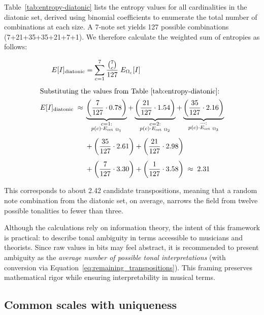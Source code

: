 \documentclass[10pt,twocolumn]{article}
\numberwithin{equation}{section} %
\begin{document}
    Table~\ref{tab:entropy-diatonic} lists the entropy values for all cardinalities in the diatonic set, derived using binomial coefficients to enumerate the total number of combinations at each size.
    A 7‑note set yields 127 possible combinations (7+21+35+35+21+7+1).
    We therefore calculate the weighted sum of entropies as follows:

    \begin{align}
        E[I]_{\text{diatonic}} &= \sum_{c=1}^{7} \frac{\binom{7}{c}}{127} \; E_{\Omega_c}[I]
        \label{eq:diatonic-avg} \\[4pt]
        \intertext{Substituting the values from Table~\ref{tab:entropy-diatonic}:}
        E[I]_{\text{diatonic}} \;\approx\; &
        \underbrace{\left( \frac{7}{127} \cdot 0.78 \right)}_{\substack{c=1:\\ p(c)\cdot E_{\text{set}~\Omega_1}}} +
        \underbrace{\left( \frac{21}{127} \cdot 1.54 \right)}_{\substack{c=2:\\ p(c)\cdot E_{\text{set}~\Omega_2}}} +
        \underbrace{\left( \frac{35}{127} \cdot 2.16 \right)}_{\substack{\dots:\\ p(c)\cdot E_{\text{set}~\Omega_3}}}
        \notag \\[4pt]
        &+ \left( \frac{35}{127} \cdot 2.61 \right) +
        \left( \frac{21}{127} \cdot 2.98 \right)
        \notag \\[4pt]
        &+ \left( \frac{7}{127} \cdot 3.30 \right) +
        \left( \frac{1}{127} \cdot 3.58 \right)
        \;\approx\; 2.31
        \label{eq:diatonic-sub}
    \end{align}

    

    This corresponds to about 2.42 candidate transpositions, meaning that a random note combination from the diatonic set, on average, narrows the field from twelve possible tonalities to fewer than three.

    Although the calculations rely on information theory, the intent of this framework is practical: to describe tonal ambiguity in terms accessible to musicians and theorists.
    Since raw values in bits may feel abstract, it is recommended to present ambiguity as the \textit{average number of possible tonal interpretations} (with conversion via Equation~\ref{eq:remaining_transpositions}).
    This framing preserves mathematical rigor while ensuring interpretability in musical terms.

    \subsection{Common scales with uniqueness}
\end{document}
